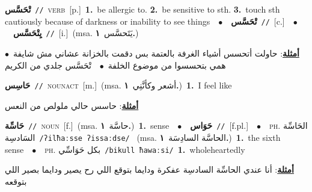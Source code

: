 \documentclass[10pt,a4paper,twoside]{article} %
\begin{document}
\begin{multicols}{2}
{\setlength\topsep{0pt}\textbf{\foreignlanguage{arabic}{تْحَسَّس}}\ {\color{gray}\texttt{//}\color{black}}\ \textsc{verb}\ [p.]\ \textbf{1.}~be allergic to.  \textbf{2.}~be sensitive to sth.  \textbf{3.}~touch sth cautiously because of darkness or inability to see things\ \ $\bullet$\ \ \setlength\topsep{0pt}\textbf{\foreignlanguage{arabic}{تْحَسَّس}}\ {\color{gray}\texttt{//}\color{black}}\ [c.]\ \ $\bullet$\ \ \setlength\topsep{0pt}\textbf{\foreignlanguage{arabic}{يِتْحَسَّس}}\ {\color{gray}\texttt{//}\color{black}}\ [i.]\ \color{gray}(msa. \foreignlanguage{arabic}{يَتَحسَّس}~\foreignlanguage{arabic}{\textbf{١.}})\color{black}\  \begin{flushright}\color{gray}\foreignlanguage{arabic}{\textbf{\underline{\foreignlanguage{arabic}{أمثلة}}}: حاولت أتحسس أشياء الغرفة بالعتمة بس دقمت بالخزانة عشاني مش شايفة\ $\bullet$\ \  همي بتحسسوا من موضوع الخلفة\ $\bullet$\ \  تْحَسَّس جلدي من الكريم}\end{flushright}\color{black}} \vspace{2mm}

{\setlength\topsep{0pt}\textbf{\foreignlanguage{arabic}{حَاسِس}}\ {\color{gray}\texttt{//}\color{black}}\ \textsc{noun\textunderscore act}\ [m.]\ \color{gray}(msa. \foreignlanguage{arabic}{أشعر وكأنَّنِي}~\foreignlanguage{arabic}{\textbf{١.}})\color{black}\ \textbf{1.}~I feel like\  \begin{flushright}\color{gray}\foreignlanguage{arabic}{\textbf{\underline{\foreignlanguage{arabic}{أمثلة}}}: حاسس حالي ملولص من النعس}\end{flushright}\color{black}} \vspace{2mm}

{\setlength\topsep{0pt}\textbf{\foreignlanguage{arabic}{حَاسِّة}}\ {\color{gray}\texttt{//}\color{black}}\ \textsc{noun}\ [f.]\ \color{gray}(msa. \foreignlanguage{arabic}{حاسَّة}~\foreignlanguage{arabic}{\textbf{١.}})\color{black}\ \textbf{1.}~sense\ \ $\bullet$\ \ \setlength\topsep{0pt}\textbf{\foreignlanguage{arabic}{حَوَاس}}\ {\color{gray}\texttt{//}\color{black}}\ [f.pl.]\ \ $\bullet$\ \ \textsc{ph.} \color{gray} \foreignlanguage{arabic}{الحَاسِّة السَادسِة}\color{black}\ {\color{gray}\texttt{/{\sffamily ʔilħaːsse ʔissaːdse}/}\color{black}}\ \color{gray} (msa. \foreignlanguage{arabic}{الحاسَّة السادِسَة}~\foreignlanguage{arabic}{\textbf{١.}})\color{black}\ \textbf{1.}~the sixth sense\ \ $\bullet$\ \ \textsc{ph.} \color{gray} \foreignlanguage{arabic}{بكل حَوَاسِّي}\color{black}\ {\color{gray}\texttt{/{\sffamily bikull ħawaːsi}/}\color{black}}\ \textbf{1.}~wholeheartedly\  \begin{flushright}\color{gray}\foreignlanguage{arabic}{\textbf{\underline{\foreignlanguage{arabic}{أمثلة}}}: أنا عندي الحاسِّة السادسِة عفكرة ودايما بتوقع اللي رح يصير ودايما بصير اللي بتوقعه}\end{flushright}\color{black}} \vspace{2mm}


\end{multicols}
\end{document}
